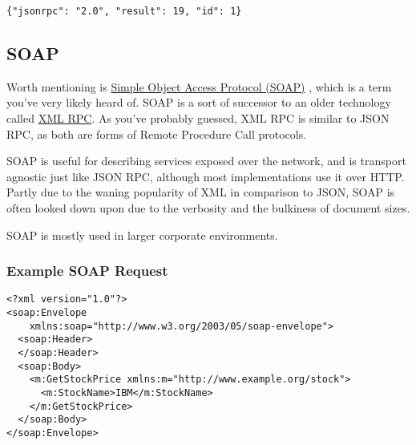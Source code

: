 \begin{verbatim}
{"jsonrpc": "2.0", "result": 19, "id": 1}
\end{verbatim}


\subsection{SOAP}

Worth mentioning is \href{https://en.wikipedia.org/wiki/SOAP}{Simple Object Access Protocol (SOAP)} \cite{SOAP}, which is a term you've very likely heard of. SOAP is a sort of successor to an older technology called \href{https://en.wikipedia.org/wiki/XML-RPC}{XML RPC}. As you've probably guessed, XML RPC is similar to JSON RPC, as both are forms of Remote Procedure Call protocols.

SOAP is useful for describing services exposed over the network, and is transport agnostic just like JSON RPC, although most implementations use it over HTTP. Partly due to the waning popularity of XML in comparison to JSON, SOAP is often looked down upon due to the verbosity and the bulkiness of document sizes.

SOAP is mostly used in larger corporate environments.

\subsubsection{Example SOAP Request}

\begin{verbatim}
<?xml version="1.0"?>
<soap:Envelope
    xmlns:soap="http://www.w3.org/2003/05/soap-envelope">
  <soap:Header>
  </soap:Header>
  <soap:Body>
    <m:GetStockPrice xmlns:m="http://www.example.org/stock">
      <m:StockName>IBM</m:StockName>
    </m:GetStockPrice>
  </soap:Body>
</soap:Envelope>
\end{verbatim}
